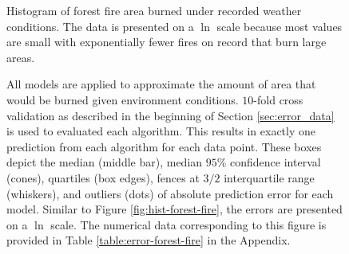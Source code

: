 \begin{figure}
  \centering
  \caption{Histogram of forest fire area burned under recorded weather
    conditions. The data is presented on a $\ln$ scale because
    most values are small with exponentially fewer fires on record
    that burn large areas.}
  \label{fig:hist-forest-fire}

  \vspace{.3cm}

  \caption{All models are applied to approximate the amount of area
    that would be burned given environment conditions. $10$-fold cross
    validation as described in the beginning of Section \ref{sec:error_data}
    is used to evaluated each algorithm. This results in exactly one
    prediction from each algorithm for each data point. These boxes
    depict the median (middle bar), median $95\%$ confidence interval
    (cones), quartiles (box edges), fences at $3/2$ interquartile
    range (whiskers), and outliers (dots) of absolute prediction error
    for each model. Similar to Figure \ref{fig:hist-forest-fire}, the
    errors are presented on a $\ln$ scale. The numerical data
    corresponding to this figure is provided in Table
    \ref{table:error-forest-fire} in the Appendix.}
  \label{fig:error-forest-fire}
\end{figure}


